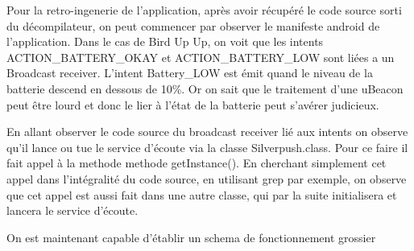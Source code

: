 \documentclass[12pt]{article}
\begin{document}
Pour la retro-ingenerie de l'application, après avoir récupéré le code source sorti du décompilateur, on peut commencer par observer le manifeste android de l'application. Dans le cas de Bird Up Up, on voit que les intents ACTION\_BATTERY\_OKAY et ACTION\_BATTERY\_LOW sont liées a un Broadcast receiver. L'intent Battery\_LOW est émit quand le niveau de la batterie descend en dessous de 10\%. Or on sait que le traitement d'une uBeacon peut être lourd et donc le lier à l'état de la batterie peut s'avérer judicieux.

En allant observer le code source du broadcast receiver lié aux intents on observe qu'il lance ou tue le service d'écoute via la classe Silverpush.class.
Pour ce faire il fait appel à la methode methode getInstance(). En cherchant simplement cet appel dans l'intégralité du code source, en utilisant grep par exemple, on observe que cet appel est aussi fait dans une autre classe, qui par la suite initialisera et lancera le service d'écoute.

On est maintenant capable d'établir un schema de fonctionnement grossier

\newpage


\end{document}
